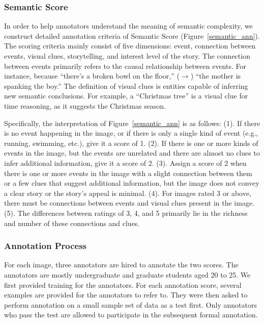 \subsubsection{Semantic Score}

In order to help annotators understand the meaning of semantic complexity, we construct detailed annotation criteria of Semantic Score (Figure~\ref{semantic_ann}).
The scoring criteria mainly consist of five dimensions: event, connection between events, visual clues, storytelling, and interest level of the story.
The connection between events primarily refers to the causal relationship between events.
For instance, because ``there's a broken bowl on the floor,''  ($\rightarrow$) ``the mother is spanking the boy.''
The definition of visual clues is entities capable of inferring new semantic conclusions. 
For example, a ``Christmas tree'' is a visual clue for time reasoning, as it suggests the Christmas season.

Specifically, the interpretation of Figure~\ref{semantic_ann} is as follows:
(1). If there is no event happening in the image, or if there is only a single kind of event (e.g., running, swimming, etc.), give it a score of 1.
(2). If there is one or more kinds of events in the image, but the events are unrelated and there are almost no clues to infer additional information, give it a score of 2.
(3). Assign a score of 2 when there is one or more events in the image with a slight connection between them or a few clues that suggest additional information, but the image does not convey a clear story or the story's appeal is minimal.
(4). For images rated 3 or above, there must be connections between events and visual clues present in the image. 
(5). The differences between ratings of 3, 4, and 5 primarily lie in the richness and number of these connections and clues.


\subsubsection{Annotation Process}
For each image, three annotators are hired to annotate the two scores.
The annotators are mostly undergraduate and graduate students aged 20 to 25.
We first provided training for the annotators. 
For each annotation score, several examples are provided for the annotators to refer to. 
They were then asked to perform annotation on a small sample set of data as a test first. 
Only annotators who pass the test are allowed to participate in the subsequent formal annotation.

